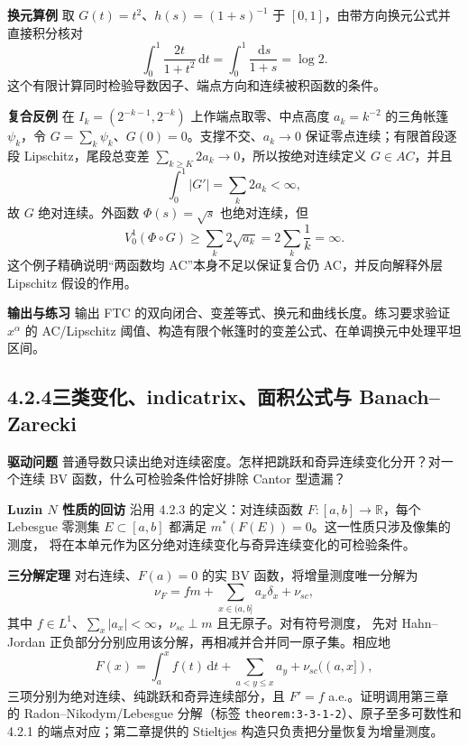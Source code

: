 \documentclass[11pt,a4paper]{ctexart}
\newcommand{\dd}{\,\mathrm d}
\newcommand{\planitem}[1]{\par\smallskip\noindent\textcolor{deepblue}{\textbf{#1}}\quad}
\newcommand{\unithead}[2]{\subsection{#1\quad #2}}
\begin{document}
\planitem{换元算例}
取 $G(t)=t^2$、$h(s)=(1+s)^{-1}$ 于 $[0,1]$，由带方向换元公式并直接积分核对
\[
\int_0^1\frac{2t}{1+t^2}\dd t
=\int_0^1\frac{\dd s}{1+s}=\log2.
\]
这个有限计算同时检验导数因子、端点方向和连续被积函数的条件。

\planitem{复合反例}
在 $I_k=(2^{-k-1},2^{-k})$ 上作端点取零、中点高度 $a_k=k^{-2}$ 的三角帐篷 $\psi_k$，令 $G=\sum_k\psi_k$、$G(0)=0$。支撑不交、$a_k\to0$ 保证零点连续；有限首段逐段 Lipschitz，尾段总变差 $\sum_{k\ge K}2a_k\to0$，所以按绝对连续定义 $G\in AC$，并且
\[
\int_0^1|G'|=\sum_k2a_k<\infty,
\]
故 $G$ 绝对连续。外函数 $\Phi(s)=\sqrt{s}$ 也绝对连续，但
\[
V_0^1(\Phi\circ G)\ge\sum_k2\sqrt{a_k}
=2\sum_k\frac1k=\infty.
\]
这个例子精确说明“两函数均 AC”本身不足以保证复合仍 AC，并反向解释外层 Lipschitz 假设的作用。

\planitem{输出与练习}
输出 FTC 的双向闭合、变差等式、换元和曲线长度。练习要求验证 $x^\alpha$ 的 AC/Lipschitz 阈值、构造有限个帐篷时的变差公式、在单调换元中处理平坦区间。

\unithead{4.2.4}{三类变化、indicatrix、面积公式与 Banach--Zarecki}

\planitem{驱动问题}
普通导数只读出绝对连续密度。怎样把跳跃和奇异连续变化分开？对一个连续 BV 函数，什么可检验条件恰好排除 Cantor 型遗漏？

\planitem{Luzin $N$ 性质的回访}
沿用 4.2.3 的定义：对连续函数 $F:[a,b]\to\mathbb R$，每个 Lebesgue 零测集
$E\subset[a,b]$ 都满足 $m^*(F(E))=0$。这一性质只涉及像集的测度，
将在本单元作为区分绝对连续变化与奇异连续变化的可检验条件。

\planitem{三分解定理}
对右连续、$F(a)=0$ 的实 BV 函数，将增量测度唯一分解为
\[
\nu_F=fm+\sum_{x\in(a,b]}a_x\delta_x+\nu_{sc},
\]
其中 $f\in L^1$、$\sum_x|a_x|<\infty$，$\nu_{sc}\perp m$ 且无原子。对有符号测度，
先对 Hahn--Jordan 正负部分分别应用该分解，再相减并合并同一原子集。相应地
\[
F(x)=\int_a^xf(t)\dd t
+\sum_{a<y\le x}a_y+\nu_{sc}((a,x]),
\]
三项分别为绝对连续、纯跳跃和奇异连续部分，且 $F'=f$ a.e.。证明调用第三章
的 Radon--Nikodym/Lebesgue 分解（标签 \texttt{theorem:3-3-1-2}）、原子至多可数性和
4.2.1 的端点对应；第二章提供的 Stieltjes 构造只负责把分量恢复为增量测度。
\end{document}
